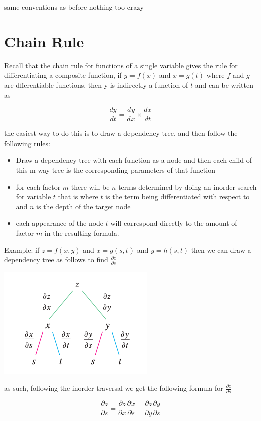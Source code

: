 \documentclass{article}
\begin{document}
same conventions as before nothing too crazy

\newpage
\section{Chain Rule}

Recall that the chain rule for functions of a single variable gives the rule for differentiating a composite function, if $y = f(x)$ and $x = g(t)$ where $f$ and $g$ are dfferentiable functions, then y is indirectly a function of $t$ and can be written as 

$$\frac{dy}{dt} = \frac{dy}{dx} \times \frac{dx}{dt} $$

the easiest way to do this is to draw a dependency tree, and then follow the following rules:

\begin{itemize}
    \item Draw a dependency tree with each function as a node and then each child of this m-way tree is the corresponding parameters of that function
    \item for each factor $m$ there will be $n$ terms determined by doing an inorder search for variable $t$ that is where $t$ is the term being differentiated with respect to and $n$ is the depth of the target node
    \item each appearance of the node $t$ will correspond directly to the amount of factor $m$ in the resulting formula.
\end{itemize}

Example: if $z = f(x,y)$ and $x = g(s,t)$ and $y = h(s,t)$ then we can draw a dependency tree as follows to find $\frac{\partial z}{\partial s}$

\includegraphics[scale=1]{dptree.png}

as such, following the inorder traversal we get the following formula for $\frac{\partial z}{\partial s}$

$$\frac{\partial z}{\partial s} = \frac{\partial z}{\partial x}\frac{\partial x}{\partial s} + \frac{\partial z}{\partial y} \frac{\partial y}{\partial s}$$
\end{document}
